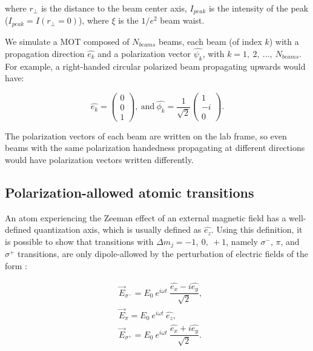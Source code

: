 \documentclass[12pt,a4paper,twoside]{article}
\begin{document}
\noindent
where $r_{\perp}$ is the distance to the beam center axis, $I_{peak}$ is the intensity of the peak ($I_{peak} = I(r_{\perp}=0)$), where $\xi$ is the $1/e^2$ beam waist.

We simulate a MOT composed of $N_{beams}$ beams, each beam (of index $k$) with a propagation direction $\hat{e_{k}}$ and a polarization vector $\hat{\psi_k}$, with $k=1,\ 2,\ ...,\ N_{beams}$. For example, a right-handed circular polarized beam propagating upwards would have:

\begin{equation*}
	\hat{e_k} =
	\begin{pmatrix}
		0 \\
		0 \\
		1
	\end{pmatrix}
	\mathrm{,\ and\ }
	\hat{\phi_k} = \dfrac{1}{\sqrt{2}}
	\begin{pmatrix}
		1 \\
		-i \\
		0
	\end{pmatrix}.
\end{equation*}

\noindent
The polarization vectors of each beam are written on the lab frame, so even beams with the same polarization handedness propagating at different directions would have polarization vectors written differently.


\subsection{Polarization-allowed atomic transitions}

An atom experiencing the Zeeman effect of an external magnetic field has a well-defined quantization axis, which is usually defined as $\hat{e_z}$. Using this definition, it is possible to show that transitions with $\Delta m_j=-1,\ 0,\ +1$, namely $\sigma^{-}$, $\pi$, and $\sigma^{+}$ transitions, are only dipole-allowed by the perturbation of electric fields of the form \cite{foot2005atomic}:

\begin{align*}
	& \vec{E}_{\sigma^{-}} = E_0\ e^{i\omega t}\ \dfrac{\hat{e_{x}} - i\hat{e_{y}}}{\sqrt{2}},\\
	& \vec{E}_{\pi} = E_0\ e^{i\omega t}\ \hat{e_z},\\
	& \vec{E}_{\sigma^{+}} = E_0\ e^{i\omega t}\ \dfrac{\hat{e_{x}} + i\hat{e_{y}}}{\sqrt{2}}.
\end{align*}
\end{document}
